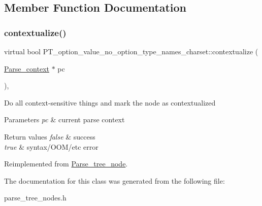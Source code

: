 \subsection{Member Function Documentation}
\mbox{\label{classPT__option__value__no__option__type__names__charset_aa54fc142e0ce2603ed24149c673a1ee9}} 
\subsubsection{\texorpdfstring{contextualize()}{contextualize()}}
{\footnotesize\ttfamily virtual bool P\+T\+\_\+option\+\_\+value\+\_\+no\+\_\+option\+\_\+type\+\_\+names\+\_\+charset\+::contextualize (\begin{DoxyParamCaption}\item[{\mbox{\hyperlink{structParse__context}{Parse\+\_\+context}} $\ast$}]{pc }\end{DoxyParamCaption})\hspace{0.3cm}{\ttfamily [inline]}, {\ttfamily [virtual]}}

Do all context-\/sensitive things and mark the node as contextualized


\begin{DoxyParams}{Parameters}
{\em pc} & current parse context\\
\hline
\end{DoxyParams}

\begin{DoxyRetVals}{Return values}
{\em false} & success \\
\hline
{\em true} & syntax/\+O\+O\+M/etc error \\
\hline
\end{DoxyRetVals}


Reimplemented from \mbox{\hyperlink{classParse__tree__node_a22d93524a537d0df652d7efa144f23da}{Parse\+\_\+tree\+\_\+node}}.



The documentation for this class was generated from the following file\+:\begin{DoxyCompactItemize}
\item 
parse\+\_\+tree\+\_\+nodes.\+h\end{DoxyCompactItemize}
